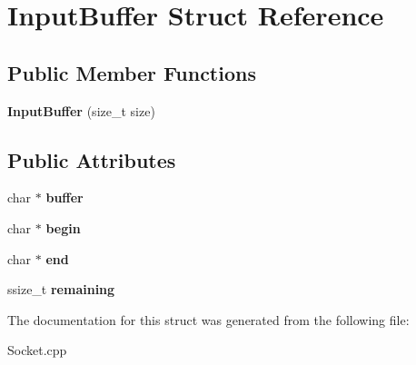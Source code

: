 \hypertarget{structInputBuffer}{\section{Input\-Buffer Struct Reference}
\label{structInputBuffer}
}
\subsection*{Public Member Functions}
\begin{DoxyCompactItemize}
\item 
\hypertarget{structInputBuffer_a9409ec8e4581caa99dcac1af963349b5}{{\bfseries Input\-Buffer} (size\-\_\-t size)}\label{structInputBuffer_a9409ec8e4581caa99dcac1af963349b5}

\end{DoxyCompactItemize}
\subsection*{Public Attributes}
\begin{DoxyCompactItemize}
\item 
\hypertarget{structInputBuffer_aee7a717b6cf023deabe9910410e6cfb6}{char $\ast$ {\bfseries buffer}}\label{structInputBuffer_aee7a717b6cf023deabe9910410e6cfb6}

\item 
\hypertarget{structInputBuffer_a2f05121c4fb8571845cc22d083c6da46}{char $\ast$ {\bfseries begin}}\label{structInputBuffer_a2f05121c4fb8571845cc22d083c6da46}

\item 
\hypertarget{structInputBuffer_a52ba71c71b9b955b8369fc5217e3c4b6}{char $\ast$ {\bfseries end}}\label{structInputBuffer_a52ba71c71b9b955b8369fc5217e3c4b6}

\item 
\hypertarget{structInputBuffer_a621d633184a77c449e7b07d705870ae2}{ssize\-\_\-t {\bfseries remaining}}\label{structInputBuffer_a621d633184a77c449e7b07d705870ae2}

\end{DoxyCompactItemize}


The documentation for this struct was generated from the following file\-:\begin{DoxyCompactItemize}
\item 
Socket.\-cpp\end{DoxyCompactItemize}

